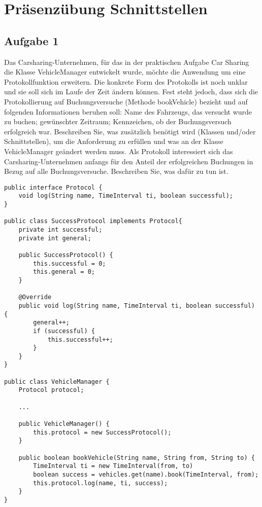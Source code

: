\chapter{Präsenzübung Schnittstellen}

\section{Aufgabe 1}

Das Carsharing-Unternehmen, für das in der praktischen Aufgabe Car Sharing die
Klasse VehicleManager entwickelt wurde, möchte die Anwendung um eine
Protokollfunktion erweitern. Die konkrete Form des Protokolls ist noch unklar
und sie soll sich im Laufe der Zeit ändern können. Fest steht jedoch, dass sich
die Protokollierung auf Buchungsversuche (Methode bookVehicle) bezieht und auf
folgenden Informationen beruhen soll: Name des Fahrzeugs, das versucht wurde zu
buchen; gewünschter Zeitraum; Kennzeichen, ob der Buchungsversuch erfolgreich
war. Beschreiben Sie, was zusätzlich benötigt wird (Klassen und/oder
Schnittstellen), um die Anforderung zu erfüllen und was an der Klasse
VehicleManager geändert werden muss. Als Protokoll interessiert sich das
Carsharing-Unternehmen anfangs für den Anteil der erfolgreichen Buchungen in
Bezug auf alle Buchungsversuche. Beschreiben Sie, was dafür zu tun ist.

\begin{lstlisting}
public interface Protocol {
    void log(String name, TimeInterval ti, boolean successful);
}

public class SuccessProtocol implements Protocol{
    private int successful;
    private int general;
    
    public SuccessProtocol() {
        this.successful = 0;
        this.general = 0;
    }

    @Override
    public void log(String name, TimeInterval ti, boolean successful) {
        general++;
        if (successful) {
            this.successful++;
        }
    }
}

public class VehicleManager {
    Protocol protocol;

    ...

    public VehicleManager() {
        this.protocol = new SuccessProtocol();
    }

    public boolean bookVehicle(String name, String from, String to) {
        TimeInterval ti = new TimeInterval(from, to)
        boolean success = vehicles.get(name).book(TimeInterval, from);
        this.protocol.log(name, ti, success);
    }
}
\end{lstlisting}